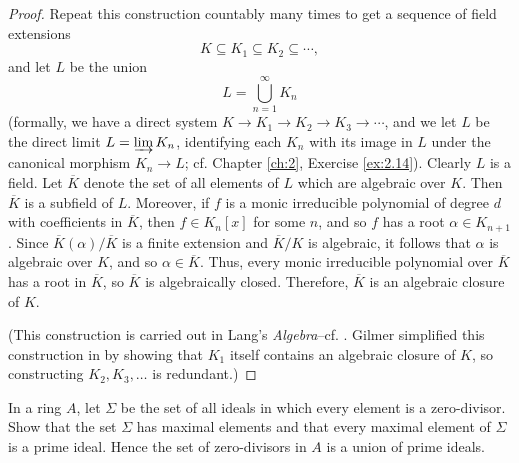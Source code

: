\begin{proof}
Repeat this construction countably many times to get a sequence of field extensions
\begin{equation*}
K \subseteq K_1 \subseteq K_2 \subseteq \cdots,
\end{equation*}
and let $L$ be the union
\begin{equation*}
L = \bigcup_{n=1}^\infty K_n
\end{equation*}
(formally, we have a direct system $K \to K_1 \to K_2 \to K_3 \to \cdots$, and we let $L$ be the direct limit $L = \varinjlim K_n$, identifying each $K_n$ with its image in $L$ under the canonical morphism $K_n \to L$; cf. Chapter \ref{ch:2}, Exercise \ref{ex:2.14}).
Clearly $L$ is a field.
Let $\overline K$ denote the set of all elements of $L$ which are algebraic over $K$.
Then $\overline K$ is a subfield of $L$.
Moreover, if $f$ is a monic irreducible polynomial of degree $d$ with coefficients in $\overline K$, then $f \in K_n[x]$ for some $n$, and so $f$ has a root $\alpha \in K_{n+1}$.
Since $\overline K(\alpha) / \overline K$ is a finite extension and $\overline K / K$ is algebraic, it follows that $\alpha$ is algebraic over $K$, and so $\alpha \in \overline K$.
Thus, every monic irreducible polynomial over $\overline K$ has a root in $\overline K$, so $\overline K$ is algebraically closed.
Therefore, $\overline K$ is an algebraic closure of $K$.

(This construction is carried out in Lang's \emph{Algebra}--cf. \cite[Chapter V, Theorem 2.5 and Corollary 2.6]{LangAlgebra}.
Gilmer simplified this construction in \cite{GilmerAlgebraicClosure} by showing that $K_1$ itself contains an algebraic closure of $K$, so constructing $K_2,K_3,\ldots$ is redundant.)
\end{proof}







\begin{exercise}
\label{ex:1.14}
In a ring $A$, let $\Sigma$ be the set of all ideals in which every element is a zero-divisor.
Show that the set $\Sigma$ has maximal elements and that every maximal element of $\Sigma$ is a prime ideal.
Hence the set of zero-divisors in $A$ is a union of prime ideals.
\end{exercise}

